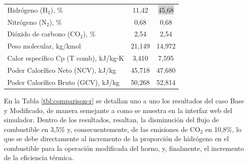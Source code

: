 \begin{table}[H]
\begin{tabular}{l|c|c}
Hidrógeno (H$_2$), \% &11,42&\colorbox{lightgray}{45,68}\\
Nitrógeno (N$_2$), \%        &0,68   &0,68   \\
Dióxido de carbono (CO$_2$), \%&2,54 &2,54   \\
\hline
Peso molecular,  kg/kmol               &21,149 &14,972 \\
Calor específico Cp (T comb),  kJ/kg-K &3,410  &7,595  \\
Poder Calorífico Neto (NCV),  kJ/kg    &45,718 &47,680 \\
Poder Calorífico Bruto (GCV),  kJ/kg   &50,268 &52,814 \\
\end{tabular}
\end{table}

\par En la Tabla \ref{tbl:comparison-r} se detallan uno a uno los resultados del caso Base y Modificado, de manera semejante a como se muestra en la interfaz web del simulador. Dentro de los resultados, resaltan, la disminución del flujo de combustible en 3,5\% y, consecuentemente, de las emisiones de CO$_2$ en 10,8\%, lo que se debe directamente al incremento de la proporción de hidrógeno en el combustible para la operación modificada del horno, y, finalmente, el incremento de la eficiencia térmica.
